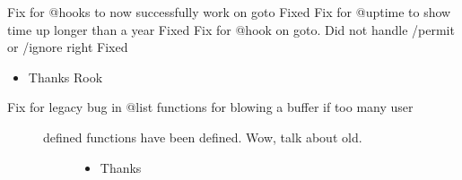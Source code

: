 \documentclass[letterpaper,10pt,english]{sphinxmanual}
\begin{document}
\sphinxAtStartPar
Fix for @hooks to now successfully work on goto \sphinxhyphen{} Fixed
Fix for @uptime to show time up longer than a year \sphinxhyphen{} Fixed
Fix for @hook on goto.  Did not handle /permit or /ignore right \sphinxhyphen{} Fixed
\begin{itemize}
\item {} 
\sphinxAtStartPar
Thanks Rook

\end{itemize}
\begin{description}
\item[{Fix for legacy bug in @list functions for blowing a buffer if too many user}] \leavevmode\begin{description}
\item[{defined functions have been defined.  Wow, talk about old.}] \leavevmode\begin{itemize}
\item {} 
\sphinxAtStartPar
Thanks 

\end{itemize}

\end{description}

\end{description}
\end{document}
